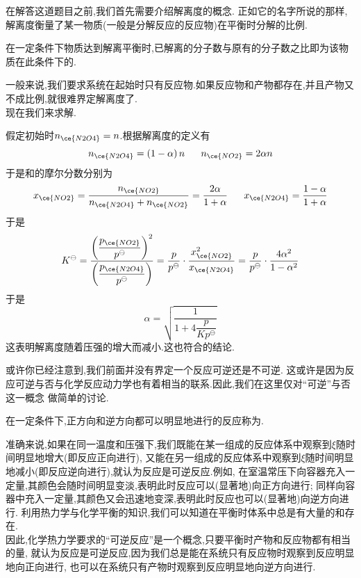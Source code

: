 \documentclass{ctexart}
\begin{document}
在解答这道题目之前,我们首先需要介绍解离度的概念.%
正如它的名字所说的那样,解离度衡量了某一物质(一般是分解反应的反应物)在平衡时分解的比例.
\begin{definition}[5B.2.7 解离度]
    在一定条件下物质达到解离平衡时,已解离的分子数与原有的分子数之比即为该物质在此条件下的.
\end{definition}
一般来说,我们要求系统在起始时只有反应物.如果反应物和产物都存在,并且产物又不成比例,就很难界定解离度了.\\
\indent 现在我们来求解.
\begin{solution}
    假定初始时$n_{\ce{N2O4}}=n$.根据解离度的定义有
    \[n_{\ce{N2O4}}=\left(1-\alpha\right)n\ \ \ \ \ n_{\ce{NO2}}=2\alpha n\]
    于是和的摩尔分数分别为
    \[x_{\ce{NO2}}=\dfrac{n_{\ce{NO2}}}{n_{\ce{N2O4}}+n_{\ce{NO2}}}=\dfrac{2\alpha}{1+\alpha}\ \ \ \ \ x_{\ce{N2O4}}=\dfrac{1-\alpha}{1+\alpha}\]
    于是
    \[K^\ominus=\dfrac{\left(\dfrac{p_{\ce{NO2}}}{p^\ominus}\right)^2}{\left(\dfrac{p_{\ce{N2O4}}}{p^\ominus}\right)}
    =\dfrac{p}{p^\ominus}\cdot\dfrac{x_{\ce{NO2}}^2}{x_{\ce{N2O4}}}
    =\dfrac{p}{p^\ominus}\cdot\dfrac{4\alpha^2}{1-\alpha^2}\]
    于是
    \[\alpha=\sqrt{\dfrac{1}{1+4\dfrac{p}{Kp^\ominus}}}\]
    这表明解离度随着压强的增大而减小.这也符合的结论.
\end{solution}
\vspace{8pt}
\indent 或许你已经注意到,我们前面并没有界定一个反应可逆还是不可逆.%
这或许是因为反应可逆与否与化学反应动力学也有着相当的联系.因此,我们在这里仅对“可逆”与否这一概念%
做简单的讨论.
\begin{definition}[5B.3.1 热力学中的可逆反应]
    在一定条件下,正方向和逆方向都可以明显地进行的反应称为.
\end{definition}
\indent 准确来说,如果在同一温度和压强下,我们既能在某一组成的反应体系中观察到$\xi$随时间明显地增大(即反应正向进行),%
又能在另一组成的反应体系中观察到$\xi$随时间明显地减小(即反应逆向进行),就认为反应是可逆反应.例如,%
在室温常压下向容器充入一定量,其颜色会随时间明显变淡,表明此时反应可以(显著地)向正方向进行;%
同样向容器中充入一定量,其颜色又会迅速地变深,表明此时反应也可以(显著地)向逆方向进行.%
利用热力学与化学平衡的知识,我们可以知道在平衡时体系中总是有大量的和存在.\\
\indent 因此,化学热力学要求的“可逆反应”是一个概念,只要平衡时产物和反应物都有相当的量,%
就认为反应是可逆反应,因为我们总是能在系统只有反应物时观察到反应明显地向正向进行,%
也可以在系统只有产物时观察到反应明显地向逆方向进行.\\
\end{document}
